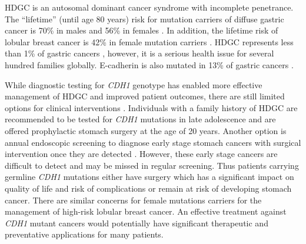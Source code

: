 \gls{HDGC} is an autosomal dominant cancer syndrome with incomplete penetrance. The ``lifetime'' (until age 80 years) risk for \gls{mutation} carriers  of diffuse gastric cancer is 70\% in males and 56\% in females \citep{Hansford2015,vanderPost2015}. In addition, the lifetime risk of lobular breast cancer is 42\% in female \gls{mutation} carriers \citep{Hansford2015}.   
%
\gls{HDGC} %
represents less than 1\% of gastric cancers \citep{Ferlay2015}, however, it is a serious health issue for several hundred families globally. 
\gls{E-cadherin} is also mutated in 13\% of  gastric cancers \citep{Ferlay2015}.

While diagnostic testing for \textit{CDH1} genotype has enabled more effective management of \gls{HDGC} and improved patient outcomes, there are still limited options for clinical interventions \citep{Guilford2010}. Individuals with a family history of \gls{HDGC} are recommended to be tested for \textit{CDH1} \glspl{mutation} in late adolescence and are offered prophylactic stomach surgery at the age of 20 years. %
Another option is annual endoscopic screening to diagnose early stage stomach cancers with surgical intervention once they are detected \citep{Oliveira2013}. However, these early stage cancers are difficult to detect and may be missed in regular screening. Thus patients carrying germline \textit{CDH1} \glspl{mutation} either have surgery which has a significant impact on quality of life and risk of complications or remain at risk of developing stomach \gls{cancer}. %
There are similar concerns for female \glspl{mutation} carriers for the management of high-risk lobular breast \gls{cancer}.
%
An effective treatment against \textit{CDH1} \gls{mutant} cancers would potentially have significant therapeutic and preventative applications for many patients.

